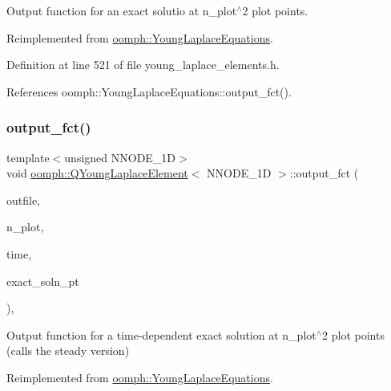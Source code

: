 Output function for an exact solutio at n\+\_\+plot$^\wedge$2 plot points. 



Reimplemented from \hyperlink{classoomph_1_1YoungLaplaceEquations_a7938b426803efb21be5d7b7e78be16c5}{oomph\+::\+Young\+Laplace\+Equations}.



Definition at line 521 of file young\+\_\+laplace\+\_\+elements.\+h.



References oomph\+::\+Young\+Laplace\+Equations\+::output\+\_\+fct().

\mbox{\label{classoomph_1_1QYoungLaplaceElement_adfb61689825789e178eeb2985c4985e8}} 
\subsubsection{\texorpdfstring{output\+\_\+fct()}{output\_fct()}\hspace{0.1cm}{\footnotesize\ttfamily [2/2]}}
{\footnotesize\ttfamily template$<$unsigned N\+N\+O\+D\+E\+\_\+1D$>$ \\
void \hyperlink{classoomph_1_1QYoungLaplaceElement}{oomph\+::\+Q\+Young\+Laplace\+Element}$<$ N\+N\+O\+D\+E\+\_\+1D $>$\+::output\+\_\+fct (\begin{DoxyParamCaption}\item[{std\+::ostream \&}]{outfile,  }\item[{const unsigned \&}]{n\+\_\+plot,  }\item[{const double \&}]{time,  }\item[{\hyperlink{classoomph_1_1FiniteElement_ad4ecf2b61b158a4b4d351a60d23c633e}{Finite\+Element\+::\+Unsteady\+Exact\+Solution\+Fct\+Pt}}]{exact\+\_\+soln\+\_\+pt }\end{DoxyParamCaption})\hspace{0.3cm}{\ttfamily [inline]}, {\ttfamily [virtual]}}



Output function for a time-\/dependent exact solution at n\+\_\+plot$^\wedge$2 plot points (calls the steady version) 



Reimplemented from \hyperlink{classoomph_1_1YoungLaplaceEquations_a53c0bf42a2e2a4469cb7f6afe235c141}{oomph\+::\+Young\+Laplace\+Equations}.



